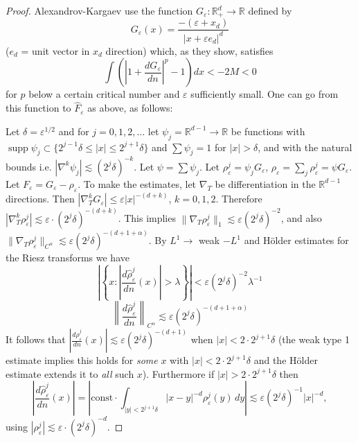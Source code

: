\documentclass[11pt,reqno]{amsart}
\newcommand{\Rd}{\mathbb{R}^d_+}
\newcommand{\Rdm}{\mathbb{R}^{d-1}}
\newcommand{\dn}[1]{\frac{d#1}{dn}}
\newcommand{\he}[1]{\widehat{#1}}          %
\DeclareMathOperator{\supp}{supp}
\begin{document}
\begin{proof}
Alexandrov-Kargaev use the function $G_\varepsilon:\Rd\to\mathbb{R}$ defined by
\begin{equation*}
  G_\varepsilon(x)=\frac{-(\varepsilon+x_d)}{|x+\varepsilon e_d|^{d}}
\end{equation*}
($e_d$ = unit vector in $x_d$ direction) which, as they show, satisfies
\begin{equation*}
  \int\left(\left|1+\dn{G_\varepsilon}\right|^{p}-1\right)dx < -2M < 0
\end{equation*}
for $p$ below a certain critical number and $\varepsilon$ sufficiently small.  One
can go from this function to $\he{F}_\varepsilon$ as above, as follows:

Let $\delta=\varepsilon^{1/2}$ and for $j=0,1,2,\dots$ let
$\psi_j=\Rdm\to\mathbb{R}$ be functions with
$\supp\psi_j\subset\{2^{j-1}\delta\leq|x|\leq 2^{j+1}\delta\}$ and
$\sum\psi_j=1$ for $|x|>\delta$, and with the natural bounds i.e.
$|\nabla^k\psi_j|\lesssim (2^j\delta)^{-k}$.  Let $\psi=\sum\psi_j$.  Let
$\rho_\varepsilon^{j}=\psi_j G_\varepsilon$,
$\rho_\varepsilon=\sum_j\rho_\varepsilon^{j}=\psi G_\varepsilon$.  Let
$F_\varepsilon=G_\varepsilon-\rho_\varepsilon$.  To make the estimates, let
$\nabla_T$ be differentiation in the $\Rdm$ directions.  Then
$|\nabla_T^k G_\varepsilon|\leq\varepsilon|x|^{-(d+k)}$, $k=0,1,2$.  Therefore
$|\nabla_T^k\rho_\varepsilon^{j}|\lesssim\varepsilon\cdot(2^j\delta)^{-(d+k)}$.
This implies $\|\nabla_T\rho_\varepsilon^{j}\|_{1}\lesssim\varepsilon(2^j\delta)^{-2}$,
and also
$\|\nabla_T\rho_\varepsilon^{j}\|_{C^\alpha}\lesssim\varepsilon(2^j\delta)^{-(d+1+\alpha)}$.
By $L^1\to$ weak $-L^1$ and H\"older estimates for the Riesz transforms we have
\begin{equation*}
  \left|\left\{x:\left|\dn{\he{\rho}_\varepsilon^{j}}(x)\right|>\lambda\right\}\right|
    <\varepsilon\left(2^j\delta\right)^{-2}\lambda^{-1}
\end{equation*}
\begin{equation*}
  \left\|\dn{\he{\rho}_\varepsilon^{j}}\right\|_{C^\alpha}
    \lesssim\varepsilon\left(2^j\delta\right)^{-(d+1+\alpha)}
\end{equation*}
It follows that
$\left|\dn{\he{\rho}_\varepsilon^{j}}(x)\right|\lesssim\varepsilon(2^j\delta)^{-(d+1)}$
when $|x|<2\cdot 2^{j+1}\delta$ (the weak type 1 estimate implies this holds for
\emph{some} $x$ with $|x|<2\cdot 2^{j+1}\delta$ and the H\"older estimate extends
it to \emph{all} such $x$).  Furthermore if $|x|>2\cdot 2^{j+1}\delta$ then
\begin{equation*}
  \left|\dn{\he{\rho}_\varepsilon^{j}}(x)\right|
   =\left|\mathrm{const}\cdot\int_{|y|<2^{j+1}\delta}|x-y|^{-d}\rho_\varepsilon^{j}(y)\,dy\right|
   \lesssim\varepsilon\left(2^j\delta\right)^{-1}|x|^{-d},
\end{equation*}
using $|\rho_\varepsilon^{j}|\lesssim\varepsilon\cdot(2^j\delta)^{-d}$.


\end{proof}
\end{document}
